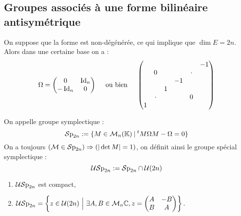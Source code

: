 \vspace{0.5em}
\subsection{Groupes associés à une forme bilinéaire antisymétrique}
\vspace{0.5em}

On suppose que la forme est non-dégénérée, ce qui implique que $\dim E = 2n$.
Alors dans une certaine base on a :
\begin{displaymath}\Omega = \begin{pmatrix}
            0 & \operatorname{Id}_n \\ -\operatorname{Id}_n & 0
           \end{pmatrix}
 \quad \text{ ou bien } \quad \begin{pmatrix}
                               &     &  &  &     & -1 \\
                               &    0 &  &  & \cdotp   &    \\
                               &     &  &-1&     &     \\
                               &     &1  &  &     &  \\
                               &\cdotp&  &  &  0  &    \\
                              1&     &  &&     &     \\
                              \end{pmatrix} \end{displaymath}


\begin{defi}
 
On appelle groupe symplectique :
\begin{displaymath} \mathcal{S}\textnormal{p}_{2n} := \{ M\in \mathcal{M}_n(\mathbb{K}) \: | \: ^tM\Omega M - \Omega = 0\}
\end{displaymath}
On a toujours $(\mathcal{M} \in \mathcal{S}\textnormal{p}_{2n}) \Rightarrow (|\det M| = 1)$, on définit ainsi
le
groupe spécial symplectique :
\begin{displaymath} \mathcal{US}\textnormal{p}_{2n} := \mathcal{S}\textnormal{p}_{2n} \cap
\mathcal{U}(2n)\end{displaymath} 
\end{defi}

\begin{prop}
\begin{enumerate}
 \item $\mathcal{US}\textnormal{p}_{2n}$ est compact,
 \item $\mathcal{US}\textnormal{p}_{2n} = \left\lbrace z \in \mathcal{U}(2n)\ \Big|\ \exists
A,B\in\mathcal{M}_n{\mathbb{C}}, z = \begin{pmatrix}A&-B\\B&A\end{pmatrix}\right\rbrace.$

\end{enumerate}
\end{prop}


